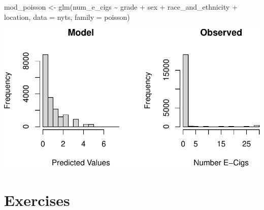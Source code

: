\documentclass[
  letterpaper,
]{latex/krantz}
\makeatletter
\newenvironment{Shaded}{\begin{snugshade}}{\end{snugshade}}
\newcommand{\AttributeTok}[1]{\textcolor[rgb]{0.40,0.45,0.13}{#1}}
\newcommand{\DecValTok}[1]{\textcolor[rgb]{0.68,0.00,0.00}{#1}}
\newcommand{\FunctionTok}[1]{\textcolor[rgb]{0.28,0.35,0.67}{#1}}
\newcommand{\NormalTok}[1]{\textcolor[rgb]{0.00,0.23,0.31}{#1}}
\newcommand{\OtherTok}[1]{\textcolor[rgb]{0.00,0.23,0.31}{#1}}
\newcommand{\SpecialCharTok}[1]{\textcolor[rgb]{0.37,0.37,0.37}{#1}}
\newcommand{\StringTok}[1]{\textcolor[rgb]{0.13,0.47,0.30}{#1}}
\newenvironment{kframe}{%
\medskip{}
\setlength{\fboxsep}{.8em}
 \def\at@end@of@kframe{}%
 \ifinner\ifhmode%
  \def\at@end@of@kframe{\end{minipage}}%
  \begin{minipage}{\columnwidth}%
 \fi\fi%
 \def\FrameCommand##1{\hskip\@totalleftmargin \hskip-\fboxsep
 \colorbox{shadecolor}{##1}\hskip-\fboxsep
     \hskip-\linewidth \hskip-\@totalleftmargin \hskip\columnwidth}%
 \MakeFramed {\advance\hsize-\width
   \@totalleftmargin\z@ \linewidth\hsize
   \@setminipage}}%
 {\par\unskip\endMakeFramed%
 \at@end@of@kframe}
\renewenvironment{Shaded}{\begin{kframe}}{\end{kframe}}
\makeatother
\begin{document}
\begin{Shaded}
\begin{Highlighting}[]
\NormalTok{mod\_poisson }\OtherTok{\textless{}{-}} \FunctionTok{glm}\NormalTok{(num\_e\_cigs }\SpecialCharTok{\textasciitilde{}}\NormalTok{ grade }\SpecialCharTok{+}\NormalTok{ sex }\SpecialCharTok{+}\NormalTok{ race\_and\_ethnicity }\SpecialCharTok{+} 
\NormalTok{                     location, }\AttributeTok{data =}\NormalTok{ nyts, }\AttributeTok{family =}\NormalTok{ poisson)}
\end{Highlighting}
\end{Shaded}

\begin{Shaded}
\end{Shaded}

\begin{center}
\includegraphics[width=1\textwidth,height=\textheight]{book/logistic_regression_files/figure-pdf/unnamed-chunk-25-1.pdf}
\end{center}

\section{Exercises}\label{exercises-9}
\end{document}

